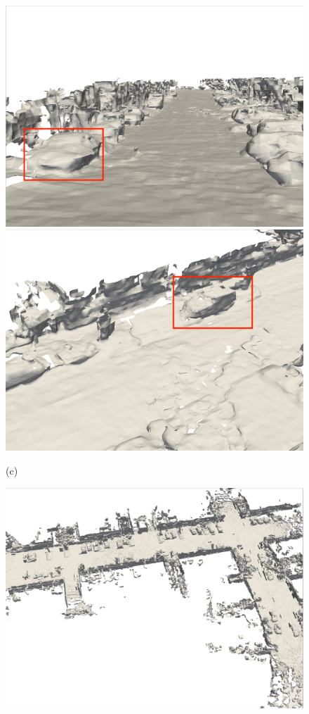\begin{figure}[htbp]
\begin{minipage}{0.322\linewidth}
		\includegraphics[width=1\linewidth]{figures/kitti_2_bce.png}
	\end{minipage}\hfill
    \begin{minipage}{0.322\linewidth}
		\centering
		\includegraphics[width=1\linewidth]{figures/kitti_3_bce.png}
	\end{minipage}\vfill
    (c)
    \begin{minipage}{0.322\linewidth}
		\centering
		\includegraphics[width=1\linewidth]{figures/kitti_1_shine.png}

\end{minipage}
\end{figure}
